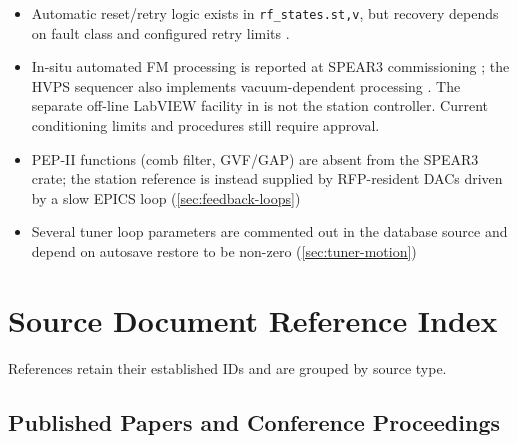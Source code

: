 \begin{itemize}
\tightlist
\item
  Automatic reset/retry logic exists in \texttt{rf\_states.st,v}, but recovery depends on fault class and configured retry limits .
\item
  In-situ automated FM processing is reported at SPEAR3 commissioning ; the HVPS sequencer also implements vacuum-dependent processing . The separate off-line LabVIEW facility in  is not the station controller. Current conditioning limits and procedures still require approval.
\item
  PEP-II functions (comb filter, GVF/GAP) are absent from the SPEAR3 crate; the station reference is instead supplied by RFP-resident DACs driven by a slow EPICS loop (\cref{sec:feedback-loops})
\item
  Several tuner loop parameters are commented out in the database source and depend on autosave restore to be non-zero (\cref{sec:tuner-motion})
\end{itemize}


\clearpage
\appendix
\section{Source Document Reference Index}\label{appendix-a--source-document-reference-index}

References retain their established IDs and are grouped by source type. 

\subsection{Published Papers and Conference Proceedings}\label{a1-published-papers-and-conference-proceedings}

